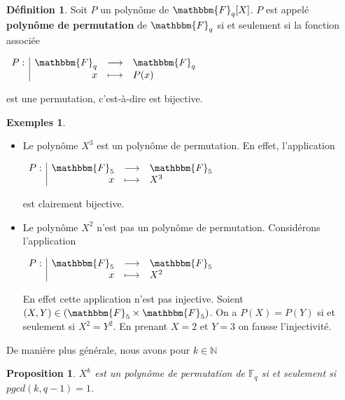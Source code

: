 \documentclass[12pt]{article}
\newcommand{\F}{\mathbbm{F}}
\newcommand{\Fq}{\mathds{F}_q}
\newtheorem{prop}{Proposition}
\theoremstyle{definition}
\newtheorem{definition}{Définition}
\newtheorem*{examples}{Exemples}
\begin{document}
\begin{definition}
Soit $P$ un polynôme de $\F_q [X]$. $P$ est appelé \textbf{polynôme de permutation} de $\F_q$ si et seulement si la fonction associée
\begin{center}
$
\begin{array}{l|rcl}
\displaystyle
P : & \F _q & \longrightarrow & \F _q \\
    & x & \longmapsto & P(x)
\end{array}
$
\end{center}
est une permutation, c'est-à-dire est bijective.
\end{definition}
\vspace{24pt}
\begin{examples}
	\begin{itemize}
On se place dans $\F_5$.\\
\item[1.] Le polynôme $X^3$ est un polynôme de permutation. En effet, l'application\\
\begin{center}
$
\begin{array}{l|rcl}
\displaystyle
P : & \F _5 & \longrightarrow & \F _5 \\
    & x & \longmapsto & X^3
\end{array}
$
\end{center}
\vspace{10pt}
est clairement bijective.\\
\item[2.] Le polynôme $X^2$ n'est pas un polynôme de permutation. Considérons l'application \\
\begin{center}
$
\begin{array}{l|rcl}
\displaystyle
P : & \F _5 & \longrightarrow & \F _5 \\
    & x & \longmapsto & X^2
\end{array}
$
\end{center}
\vspace{12pt}
En effet cette application n'est pas injective. Soient $(X,Y) \in (\F_5 \times \F_5)$. On a $P(X)=P(Y)$ si et seulement si $X^2=Y^2$. En prenant $X=2$ et $Y=3$ on fausse l'injectivité.
	\end{itemize}
\end{examples}

De manière plus générale, nous avons pour $k \in \mathds{N}$

\begin{prop}
$X^k$ est un polynôme de permutation de $\Fq$ si et seulement si $pgcd(k, q-1) = 1$.
\end{prop}
\end{document}
